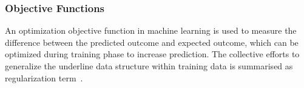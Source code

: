 \subsubsection{Objective Functions}
An optimization objective function in machine learning is used to measure the difference between the predicted outcome and expected outcome, which can be optimized during training phase to increase  prediction. The collective efforts to generalize the underline data structure within training data is summarised as regularization term~\cite{goodfellow_2015}.  